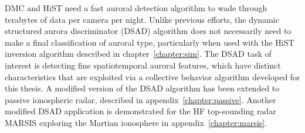 DMC and HiST need a fast auroral detection algorithm to wade through terabytes of data per camera per night. 
Unlike previous efforts, the dynamic structured aurora discriminator (DSAD) algorithm does not necessarily need to make a final classification of auroral type, particularly when used with the HiST inversion algorithm described in chapter~\ref{chapter:sim}.
The DSAD task of interest is detecting fine spatiotemporal auroral features, which have distinct characteristics that are exploited via a collective behavior algorithm developed for this thesis.
A modified version of the DSAD algorithm has been extended to passive ionospheric radar, described in appendix~\ref{chapter:passive}.
Another modified DSAD application is demonstrated for the HF top-sounding radar MARSIS exploring the Martian ionosphere in appendix~\ref{chapter:marsis}.

